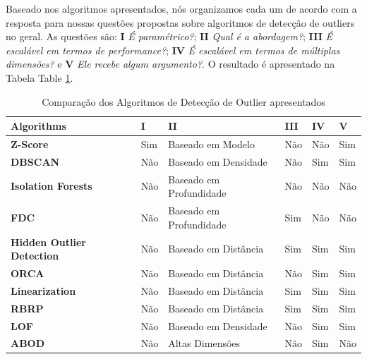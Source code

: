 Baseado nos algoritmos apresentados, nós organizamos cada um de acordo com a resposta para nossas questões propostas sobre algoritmos de detecção de outliers no geral. As questões são: \textbf{I} \textit{É paramétrico?}; \textbf{II} \textit{Qual é a abordagem?}; \textbf{III} \textit{É escalável em termos de performance?}; \textbf{IV} \textit{É escalável em termos de múltiplas dimensões?} e \textbf{V} \textit{Ele recebe algum argumento?}. O resultado é apresentado na Tabela Table \ref{table:algorithms-comparison}.

\begin{table}[]
	\centering
	\begin{tabular}{|l|l|l|l|l|l|}
		\hline
		\textbf{Algorithms}               & \textbf{I} & \textbf{II}             & \textbf{III} & \textbf{IV} & \textbf{V} \\ \hline
		\textbf{Z-Score}                  & Sim        & Baseado em Modelo       & Não          & Não         & Sim        \\ \hline
		\textbf{DBSCAN}                   & Não        & Baseado em Densidade    & Não          & Sim         & Sim        \\ \hline
		\textbf{Isolation Forests}        & Não        & Baseado em Profundidade & Não          & Não         & Não        \\ \hline
		\textbf{FDC}                      & Não        & Baseado em Profundidade & Sim          & Não         & Não        \\ \hline
		\textbf{Hidden Outlier Detection} & Não        & Baseado em Distância    & Sim          & Sim         & Sim        \\ \hline
		\textbf{ORCA}                     & Não        & Baseado em Distância    & Não          & Sim         & Sim        \\ \hline
		\textbf{Linearization}            & Não        & Baseado em Distância    & Sim          & Sim         & Sim        \\ \hline
		\textbf{RBRP}                     & Não        & Baseado em Distância    & Sim          & Sim         & Sim        \\ \hline
		\textbf{LOF}                      & Não        & Baseado em Densidade    & Não          & Sim         & Sim        \\ \hline
		\textbf{ABOD}                     & Não        & Altas Dimensões         & Não          & Sim         & Não        \\ \hline
	\end{tabular}
	\caption{Comparação dos Algoritmos de Detecção de Outlier apresentados}
	\label{table:algorithms-comparison}
\end{table}

